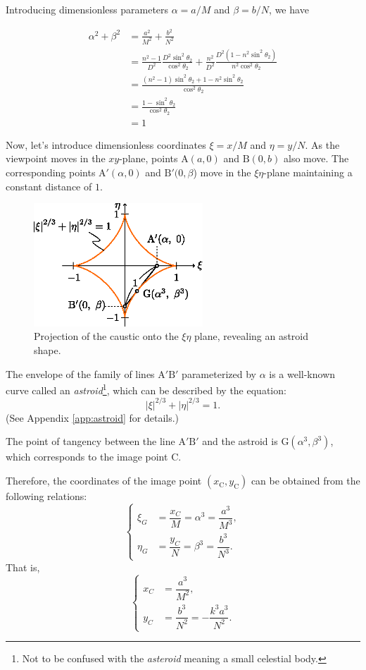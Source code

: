 \documentclass[twocolumn]{article}
\begin{document}
Introducing dimensionless parameters $\alpha = a/M$ and $\beta = b/N$, we have

$$
	\begin{aligned}
		\alpha^2 + \beta^2 &= \frac{a^2}{M^2} + \frac{b^2}{N^2} \\
		&= \frac{n^2-1}{D^2} \frac{D^2\sin^2\theta_2}{\cos^2\theta_2} + \frac{n^2}{D^2} \frac{D^2(1-n^2\sin^2\theta_2)}{n^2\cos^2\theta_2} \\
		&= \frac{(n^2-1)\sin^2\theta_2 + 1-n^2\sin^2\theta_2}{\cos^2\theta_2} \\
		&= \frac{1-\sin^2\theta_2}{\cos^2\theta_2} \\
		&= 1
	\end{aligned}
$$

Now, let's introduce dimensionless coordinates $\xi = x/M$ and $\eta = y/N$. As the viewpoint moves in the $xy$-plane, points $\mathrm{A}(a, 0)$ and $\mathrm{B}(0, b)$ also move. The corresponding points $\mathrm{A'}(\alpha, 0)$ and $\mathrm{B'}(0, \beta$) move in the $\xi\eta$-plane maintaining a constant distance of $1$.

\begin{figure}[!t]
	\centering
	\includegraphics[width=2.5in]{figs/g107.eps}	
	\caption{Projection of the caustic onto the $\xi\eta$ plane, revealing an astroid shape.}
	\label{fig:astroid}
\end{figure}

The envelope of the family of lines ${\mathrm{A'B'}}$ parameterized by $\alpha$ is a well-known curve called an \emph{astroid}\footnote{Not to be confused with the \emph{asteroid} meaning a small celestial body.}, which can be described by the equation:
$$ \left| \xi \right|^{2/3} + \left| \eta \right|^{2/3} = 1. $$
(See Appendix \ref{app:astroid} for details.)

The point of tangency between the line ${\mathrm{A'B'}}$ and the astroid is $\mathrm{G}(\alpha^3, \beta^3)$, which corresponds to the image point $\mathrm{C}$.

Therefore, the coordinates of the image point $(x_{\mathrm{C}}^{}, y_{\mathrm{C}}^{})$ can be obtained from the following relations:
$$
\left\{
\begin{aligned}
	\xi_G &= \dfrac{x_C}{M} = \alpha^3 = \dfrac{a^3}{M^3},\\
	\eta_G &= \dfrac{y_C}{N} = \beta^3 = \dfrac{b^3}{N^3}.
\end{aligned}
\right.
$$
That is,
$$
\left\{
\begin{aligned}
	x_C &= \dfrac{a^3}{M^2},\\
	y_C &= \dfrac{b^3}{N^2}=-\dfrac{k^3a^3}{N^2}.
\end{aligned}
\right.
$$
\end{document}
